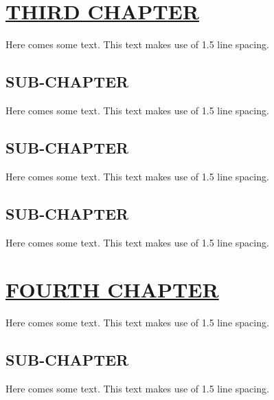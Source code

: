 \documentclass[fontsize=13pt]{scrartcl}
\begin{document}
{{{{{{{\section{\uline{THIRD CHAPTER}}
Here comes some text. This text makes use of 1.5 line spacing. 
\subsection{SUB-CHAPTER}
Here comes some text. This text makes use of 1.5 line spacing. 
\subsection{SUB-CHAPTER}
Here comes some text. This text makes use of 1.5 line spacing. 
\subsection{SUB-CHAPTER}
Here comes some text. This text makes use of 1.5 line spacing. 
\pagebreak
\section{\uline{FOURTH CHAPTER}}
Here comes some text. This text makes use of 1.5 line spacing. 
\subsection{SUB-CHAPTER}
Here comes some text. This text makes use of 1.5 line spacing. 
}}}}}}}
\end{document}
